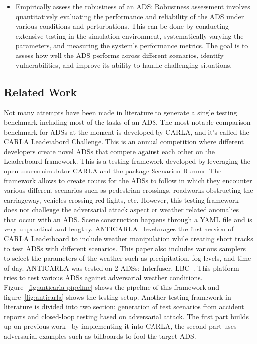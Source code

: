 \documentclass[a4paper]{article}
\begin{document}
\begin{itemize}
  \item Empirically assess the robustness of an ADS\@: Robustness assessment involves quantitatively evaluating the performance and reliability of the ADS under various conditions and perturbations. This can be done by conducting extensive testing in the simulation environment, systematically varying the parameters, and measuring the system's performance metrics. The goal is to assess how well the ADS performs across different scenarios, identify vulnerabilities, and improve its ability to handle challenging situations.
\end{itemize}

\subsection{Related Work}
Not many attempts have been made in literature to generate a single testing benchmark including most of the tasks of an ADS. The most notable comparison benchmark for ADSs at the moment is developed by CARLA, and it's called the CARLA Leaderabord Challenge. This is an annual competition where different developers create novel ADSs that compete against each other on the Leaderboard framework. This is a testing framework developed by leveraging the open source simulator CARLA and the package Scenarion Runner. The framework allows to create routes for the ADSs to follow in which they encounter various different scenarios such as pedestrian crossings, roadworks obstructing the carriageway, vehicles crossing red lights, etc. However, this testing framework does not challenge the adversarial attack aspect or weather related anomalies that occur with an ADS. Scene construction happens through a YAML file and is very unpractical and lengthy. 
ANTICARLA~\cite{ramakrishna2022anti} levelarages the first version of CARLA Leaderboard to include weather manipulation while creating short tracks to test ADSs with different scenarios. This paper also includes various samplers to select the parameters of the weather such as precipitation, fog levels, and time of day. ANTICARLA was tested on 2 ADSs: Interfuser, LBC~\cite{kendall2019learning}. This platform tries to test various ADSs against adversarial weather conditions. Figure~\ref{fig:anticarla-pipeline} shows the pipeline of this framework and figure~\ref{fig:anticarla} shows the testing setup. Another testing framework in literature \cite{wang2022adept} is divided into two section: generation of test scenarios from accident reports and closed-loop testing based on adversarial attack. The first part builds up on previous work~\cite{huynh2019ac3r} by implementing it into CARLA, the second part uses adversarial examples such as billboards to fool the target ADS.
\end{document}
